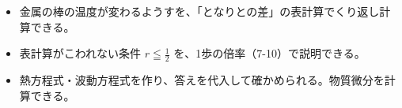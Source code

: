\newcommand\kviiinrod[3]{\begin{scope}[shift={#1}]
  \fill[bkYellow!25] (-1.5,-3.2) rectangle (#2+1.5,3.2);
  \fill[bkGray!35] (0,-1.6) rectangle (#2,1.6);
  \draw[bkInk!70, line width=0.6pt] (0,-1.6) rectangle (#2,1.6);
  \foreach \k in {1,...,#3} {\draw[bkInk!50, line width=0.4pt] ({#2*\k/#3},-1.6) -- ({#2*\k/#3},1.6);}
  \draw[bkOrange!70!black, line width=0.5pt, dash pattern=on 1.5pt off 1pt] (-1.5,-3.2) rectangle (#2+1.5,3.2);
  \end{scope}}
\makeatother


\begin{goal}
\begin{itemize}[label={\color{\bkTT}●}, leftmargin=1.6\zw, itemsep=0pt, topsep=1pt]
\item {}\enspace 金属の棒の温度が変わるようすを、「となりとの差」の表計算でくり返し計算できる。
\item {}\enspace 表計算がこわれない条件 $r\leqq\frac12$ を、1歩の倍率（7-10）で説明できる。
\item {}\enspace 熱方程式・波動方程式を作り、答えを代入して確かめられる。物質微分を計算できる。
\end{itemize}
\end{goal}

